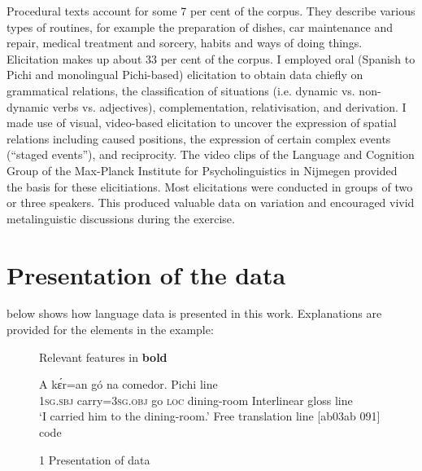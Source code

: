 Procedural texts account for some 7 per cent of the corpus. They describe various types of routines, for example the preparation of dishes, car maintenance and repair, medical treatment and sorcery, habits and ways of doing things. Elicitation makes up about 33 per cent of the corpus. I employed oral (Spanish to Pichi and monolingual Pichi-based) elicitation to obtain data chiefly on grammatical relations, the classification of situations (i.e. dynamic vs. non-dynamic verbs vs. adjectives), complementation, relativisation, and derivation. I made use of visual, video-based elicitation to uncover the expression of spatial relations including caused positions, the expression of certain complex events (“staged events”), and reciprocity. The video clips of the Language and Cognition Group of the Max-Planck Institute for Psycholinguistics in Nijmegen provided the basis for these elicitiations. Most elicitations were conducted in groups of two or three speakers. This produced valuable data on variation and encouraged vivid metalinguistic discussions during the exercise. 


\section{Presentation of the data}\label{sec:1.8}
 below shows how language data is presented in this work. Explanations are provided for the elements in the example:

\begin{figure}
\caption{1 Presentation of data}
\label{fig:key:1.1}
 Relevant features in \textbf{bold}\\
\begin{exe}
 \gll A    kɛ́r=an      gó  na  comedor. \textsf{\upshape Pichi line}\\
\textsc{1sg.sbj}  carry=\textsc{3sg.obj}    go  \textsc{loc}  dining-room \textsf{Interlinear gloss line}\\
\glt ‘I carried him to the dining-room.’ \textsf{Free translation line}  [{ab}{03}{ab} {091}] \textsf{code}\\
\end{exe}
\end{figure}

